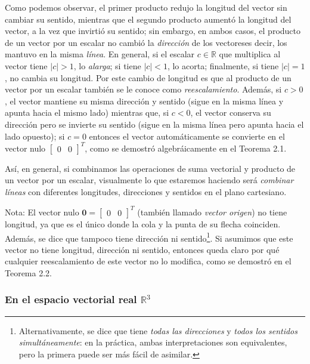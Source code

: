 \documentclass[12pt]{article}
\begin{document}
Como podemos observar, el primer producto redujo la longitud del vector sin cambiar su sentido, mientras que el segundo producto aumentó la longitud del vector, a la vez que invirtió su sentido; sin embargo, en ambos casos, el producto de un vector por un escalar no cambió la \emph{dirección} de los vectores\textemdash es decir, los mantuvo en la misma \emph{línea}. En general, si el escalar $c\in\mathbb{R}$ que multiplica al vector tiene $|c|>1$, lo \emph{alarga}; si tiene $|c|<1$, lo acorta; finalmente, si tiene $|c|=1$, no cambia su longitud. Por este cambio de longitud es que al producto de un vector por un escalar también se le conoce como \emph{reescalamiento}. Además, si $c>0$, el vector mantiene su misma dirección y sentido (sigue en la misma línea y apunta hacia el mismo lado) mientras que, si $c<0$, el vector conserva su dirección pero se invierte su sentido (sigue en la misma línea pero apunta hacia el lado opuesto); si $c=0$ entonces el vector automáticamente se convierte en el vector nulo $\begin{bmatrix}0&0\end{bmatrix}^T$, como se demostró algebráicamente en el Teorema 2.1.

Así, en general, si combinamos las operaciones de suma vectorial y producto de un vector por un escalar, visualmente lo que estaremos haciendo será \emph{combinar líneas} con diferentes longitudes, direcciones y sentidos en el plano cartesiano.

\vspace{3mm}

Nota: El vector nulo $\mathbf{0}=\begin{bmatrix}0&0\end{bmatrix}^T$ (también llamado \emph{vector origen}) no tiene longitud, ya que es el único donde la cola y la punta de su flecha coinciden. Además, se dice que tampoco tiene dirección ni sentido\footnote{Alternativamente, se dice que tiene \emph{todas las direcciones} y \emph{todos los sentidos simultáneamente}: en la práctica, ambas interpretaciones son equivalentes, pero la primera puede ser más fácil de asimilar.}. Si asumimos que este vector no tiene longitud, dirección ni sentido, entonces queda claro por qué cualquier reescalamiento de este vector no lo modifica, como se demostró en el Teorema 2.2.

\subsubsection{En el espacio vectorial real $\mathbb{R}^3$}
\end{document}
